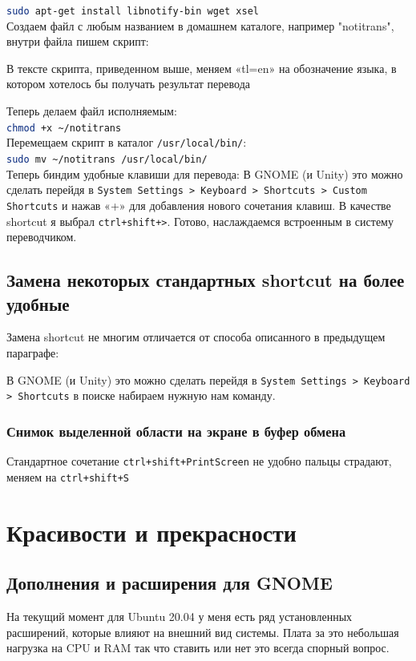 \documentclass[a4paper, 12pt]{report}
\begin{document}
\lstinline[language=sh]{sudo apt-get install libnotify-bin wget xsel}\\

Создаем файл с любым названием в домашнем каталоге, например "notitrans", внутри файла пишем скрипт:



В тексте скрипта, приведенном выше, меняем «tl=en» на обозначение языка, в котором хотелось бы получать результат перевода

Теперь делаем файл исполняемым:\\
\lstinline[language=sh]{chmod +x ~/notitrans}\\

Перемещаем скрипт в каталог \lstinline|/usr/local/bin/|:\\
\lstinline[language=sh]{sudo mv ~/notitrans /usr/local/bin/}\\

Теперь биндим удобные клавиши для перевода:
В GNOME (и Unity) это можно сделать перейдя в \lstinline|System Settings > Keyboard > Shortcuts > Custom Shortcuts| и нажав «+» для добавления нового сочетания клавиш. В качестве shortcut я выбрал \lstinline|ctrl+shift+>|. Готово, наслаждаемся встроенным в систему переводчиком.

\section{Замена некоторых стандартных shortcut на более удобные}
Замена shortcut не многим отличается от способа описанного в предыдущем параграфе:

В GNOME (и Unity) это можно сделать перейдя в \lstinline|System Settings > Keyboard > Shortcuts| в поиске набираем нужную нам команду.

\subsection{Снимок выделенной области на экране в буфер обмена}
Стандартное сочетание \lstinline|ctrl+shift+PrintScreen| не удобно пальцы страдают, меняем на \lstinline|ctrl+shift+S| 

\chapter{Красивости и прекрасности}
\section{Дополнения и расширения для GNOME} На текущий момент для Ubuntu 20.04 у меня есть ряд установленных расширений, которые влияют на внешний вид системы. Плата за это небольшая нагрузка на CPU и RAM так что ставить или нет это всегда спорный вопрос.
\end{document}
